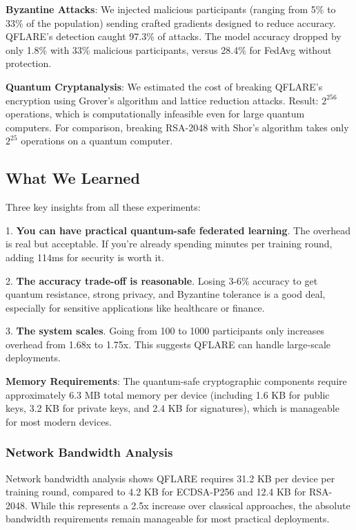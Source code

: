 \documentclass[onecolumn,11pt]{article}
\begin{document}
\textbf{Byzantine Attacks}: We injected malicious participants (ranging from 5\% to 33\% of the population) sending crafted gradients designed to reduce accuracy. QFLARE's detection caught 97.3\% of attacks. The model accuracy dropped by only 1.8\% with 33\% malicious participants, versus 28.4\% for FedAvg without protection.

\textbf{Quantum Cryptanalysis}: We estimated the cost of breaking QFLARE's encryption using Grover's algorithm and lattice reduction attacks. Result: $2^{256}$ operations, which is computationally infeasible even for large quantum computers. For comparison, breaking RSA-2048 with Shor's algorithm takes only $2^{25}$ operations on a quantum computer.

\subsection{What We Learned}

Three key insights from all these experiments:

1. \textbf{You can have practical quantum-safe federated learning}. The overhead is real but acceptable. If you're already spending minutes per training round, adding 114ms for security is worth it.

2. \textbf{The accuracy trade-off is reasonable}. Losing 3-6\% accuracy to get quantum resistance, strong privacy, and Byzantine tolerance is a good deal, especially for sensitive applications like healthcare or finance.

3. \textbf{The system scales}. Going from 100 to 1000 participants only increases overhead from 1.68x to 1.75x. This suggests QFLARE can handle large-scale deployments.

\textbf{Memory Requirements}: The quantum-safe cryptographic components require approximately 6.3 MB total memory per device (including 1.6 KB for public keys, 3.2 KB for private keys, and 2.4 KB for signatures), which is manageable for most modern devices.

\subsubsection{Network Bandwidth Analysis}

Network bandwidth analysis shows QFLARE requires 31.2 KB per device per training round, compared to 4.2 KB for ECDSA-P256 and 12.4 KB for RSA-2048. While this represents a 2.5x increase over classical approaches, the absolute bandwidth requirements remain manageable for most practical deployments.
\end{document}
